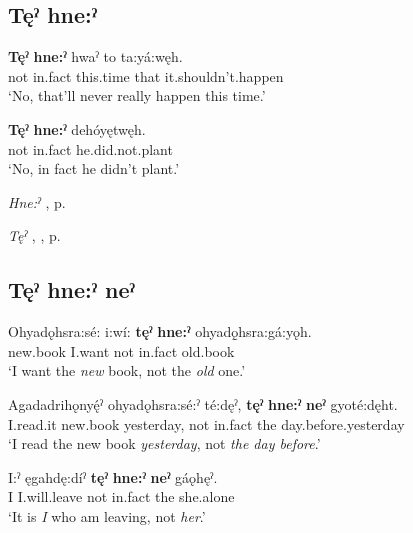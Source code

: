 \subsection*{\textbf{Tęˀ hne:ˀ} } \label{p:[tęˀ hne:ˀ]}

\ea
\label{ex:tpart43}
\gll \textbf{Tęˀ} \textbf{hne:ˀ} hwaˀ to ta:yá:węh.\\
not in.fact this.time that it.shouldn’t.happen\\
\glt ‘No, that’ll never really happen this time.’
\z

\ea
\label{ex:tpart44}
\gll \textbf{Tęˀ} \textbf{hne:ˀ} dehóyętwęh.\\
not in.fact he.did.not.plant\\
\glt ‘No, in fact he didn’t plant.’
\z

\begin{CayugaRelated}
\item \textit{Hne:ˀ} , p. \pageref{p:[hne:ˀ] ‘in fact’}\\
\item \textit{Tęˀ} , , p. \pageref{p:[tęˀ]}
\end{CayugaRelated}

\subsection*{\textbf{Tęˀ hne:ˀ neˀ} } \label{p:[tęˀ hne:ˀ neˀ]}

\ea
\label{ex:tpart45}
\gll Ohyadǫhsra:sé: i:wí: \textbf{tęˀ} \textbf{hne:ˀ} ohyadǫ̱hsra:gá:yǫh.\\
new.book I.want not in.fact old.book\\
\glt ‘I want the \emph{new} book, not the \emph{old} one.’
\z

\ea
\label{ex:tpart46}
\gll Agadadrihǫnyę́ˀ ohyadǫhsra:sé:ˀ té:dęˀ, \textbf{tęˀ} \textbf{hne:ˀ} \textbf{neˀ} gyoté:dęht.\\
I.read.it new.book yesterday, not in.fact the day.before.yesterday\\
\glt ‘I read the new book \emph{yesterday}, not \emph{the day before}.’
\z

\ea
\label{ex:tpart47}
\gll I:ˀ ęgahdę:díˀ \textbf{tęˀ} \textbf{hne:ˀ} \textbf{neˀ} gáǫhęˀ.\\
I I.will.leave not in.fact the she.alone\\
\glt ‘It is \emph{I} who am leaving, not \emph{her}.’
\z

